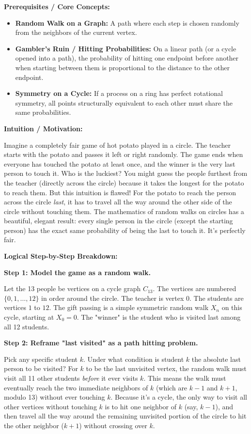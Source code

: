 \begin{solution}
\textbf{Prerequisites / Core Concepts:}
\begin{itemize}
    \item \textbf{Random Walk on a Graph:} A path where each step is chosen randomly from the neighbors of the current vertex.
    \item \textbf{Gambler's Ruin / Hitting Probabilities:} On a linear path (or a cycle opened into a path), the probability of hitting one endpoint before another when starting between them is proportional to the distance to the other endpoint.
    \item \textbf{Symmetry on a Cycle:} If a process on a ring has perfect rotational symmetry, all points structurally equivalent to each other must share the same probabilities.
\end{itemize}

\textbf{Intuition / Motivation:}

Imagine a completely fair game of hot potato played in a circle. The teacher starts with the potato and passes it left or right randomly. The game ends when everyone has touched the potato at least once, and the winner is the very last person to touch it. Who is the luckiest? 
You might guess the people furthest from the teacher (directly across the circle) because it takes the longest for the potato to reach them. But this intuition is flawed! For the potato to reach the person across the circle \textit{last}, it has to travel all the way around the other side of the circle without touching them. The mathematics of random walks on circles has a beautiful, elegant result: every single person in the circle (except the starting person) has the exact same probability of being the last to touch it. It's perfectly fair.

\textbf{Logical Step-by-Step Breakdown:}

\textbf{Step 1: Model the game as a random walk.}

Let the 13 people be vertices on a cycle graph $C_{13}$. The vertices are numbered $\{0, 1, \dots, 12\}$ in order around the circle.
The teacher is vertex 0. The students are vertices $1$ to $12$.
The gift passing is a simple symmetric random walk $X_n$ on this cycle, starting at $X_0 = 0$.
The "winner" is the student who is visited last among all 12 students.

\textbf{Step 2: Reframe "last visited" as a path hitting problem.}

Pick any specific student $k$. Under what condition is student $k$ the absolute last person to be visited?
For $k$ to be the last unvisited vertex, the random walk must visit all 11 other students \textit{before} it ever visits $k$.
This means the walk must eventually reach the two immediate neighbors of $k$ (which are $k-1$ and $k+1$, modulo 13) without ever touching $k$.
Because it's a cycle, the only way to visit all other vertices without touching $k$ is to hit one neighbor of $k$ (say, $k-1$), and then travel all the way around the remaining unvisited portion of the circle to hit the other neighbor ($k+1$) without crossing over $k$.


\end{solution}
